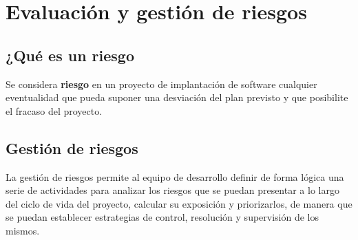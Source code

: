 
\section{Evaluación y gestión de riesgos}
\subsection{¿Qué es un riesgo}
Se considera \textbf{riesgo} en un proyecto de implantación de software cualquier 
eventualidad que pueda suponer una desviación del plan previsto y que posibilite el 
fracaso del proyecto. 

\subsection{Gestión de riesgos}
La gestión de riesgos permite al equipo de desarrollo definir de forma lógica una serie 
de actividades para analizar los riesgos que se puedan presentar a lo largo del ciclo
de vida del proyecto, calcular su exposición y priorizarlos, de manera que se puedan 
establecer estrategias de control, resolución y supervisión de los mismos.

